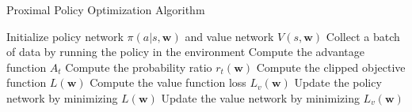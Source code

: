 \begin{algorithm}
\caption{Proximal Policy Optimization Algorithm}\label{alg:ppo}
\begin{algorithmic}
\State Initialize policy network $\pi(a|s, \textbf{w})$ and value network $V(s, \textbf{w})$
        \State Collect a batch of data by running the policy in the environment
        \State Compute the advantage function $A_t$
        \State Compute the probability ratio $r_t(\textbf{w})$
        \State Compute the clipped objective function $L(\textbf{w})$
        \State Compute the value function loss $L_v(\textbf{w})$
        \State Update the policy network by minimizing $L(\textbf{w})$
        \State Update the value network by minimizing $L_v(\textbf{w})$
    \EndFor
\EndFor
\end{algorithmic}
\end{algorithm}

